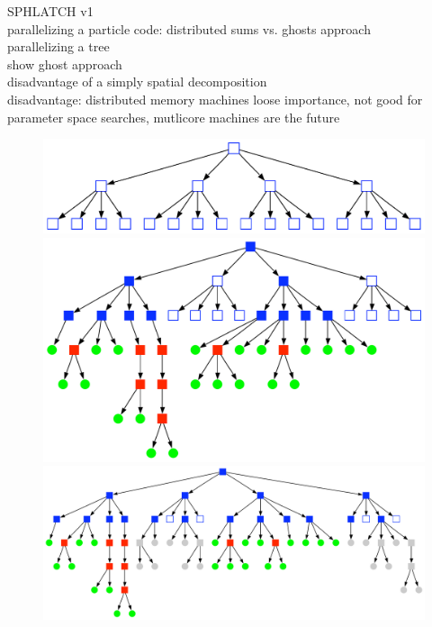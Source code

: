 SPHLATCH v1\\
parallelizing a particle code: distributed sums vs. ghosts approach\\
parallelizing a tree\\
show ghost approach\\
disadvantage of a simply spatial decomposition\\

disadvantage: distributed memory machines loose importance, not good for parameter space searches, mutlicore machines are the future






\begin{figure}[htbp]
\begin{center}
\includegraphics[scale=0.35]{07quadtree50_TPL2_stage1.pdf}\\ \vspace{1.0cm}
\includegraphics[scale=0.35]{07quadtree50_TPL2_stage2a.pdf}\\
\includegraphics[scale=0.35]{07quadtree50_TPL2_stage2b.pdf}\\

\end{center}
\end{figure}
